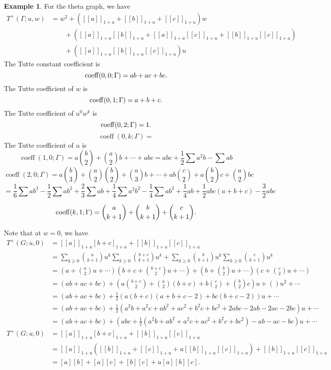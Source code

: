 \documentclass{amsart}
\theoremstyle{definition}
\newtheorem{eg}[thm]{Example}
\DeclareMathOperator{\coeff}{coeff}
\newcommand{\fanalog}[2]{[\![#2]\!]_{#1}}
\begin{document}
\begin{eg}
For the theta graph, we have
\begin{align*}
T^+(\Gamma; u,w) &= w^2 + (\fanalog{1 + u}{a} + \fanalog{1 + u}{b} + \fanalog{1 + u}{c})w  \\
&\qquad + (\fanalog{1 + u}{a} \fanalog{1 + u}{b} + \fanalog{1 + u}{a} \fanalog{1 + u}{c}  + \fanalog{1 + u}{b} \fanalog{1 + u}{c}) \\
&\qquad + (\fanalog{1 + u}{a} \fanalog{1 + u}{b} \fanalog{1 + u}{c})u
\end{align*}
The Tutte constant coefficient is 
$$ {\rm coeff}(0,0; \Gamma) = ab + ac + bc .$$
The Tutte coefficient of $w$ is
$$ {\rm coeff}(0,1; \Gamma) = a + b + c .$$
The Tutte coefficient of $u^0 w^k$ is
$$ {\rm coeff}(0,2; \Gamma) = 1 .$$
$$ \coeff(0,k; \Gamma) = $$
The Tutte coefficient of $u$ is 
\[
	\coeff(1, 0; \Gamma) = a \binom{b}{2} + \binom{a}{2} b + \cdots + abc
	= abc + \frac12 \sum a^2 b - \sum ab
\]
\[
	\coeff(2, 0; \Gamma) = a \binom{b}{3} + \binom{a}{2} \binom{b}{2} + \binom{a}{3} b + \cdots + ab \binom{c}{2} + a \binom{b}{2} c + \binom{a}{2} bc
\]
\[
	= \frac16 \sum a b^3 - \frac12 \sum a b^2 + \frac23 \sum a b + \frac14 \sum a^2 b^2 - \frac14 \sum a b^2 + \frac14 a b + \frac12 abc(a + b + c) - \frac32 abc
\]


$$ {\rm coeff}(k,1; \Gamma) = \binom{a}{k+1} + \binom{b}{k+1} + \binom{c}{k+1} .$$

Note that at $w = 0$, we have
\begin{align*}
T^+(G;u,0) &= \fanalog{1 + u}{a} [b+c]_{1+u} + \fanalog{1 + u}{b}\fanalog{1 + u}{c} \\
&= \sum_{k\geq 0}\binom{a}{k+1}u^k \sum_{k\geq 0} \binom{b+c}{k+1}u^k + \sum_{k\geq 0}\binom{b}{k+1}u^k \sum_{k\geq 0}\binom{c}{k+1}u^k \\
&= \left( a + \binom{a}{2}u + \cdots\right) \left(b + c + \binom{b+c}{2} u + \cdots\right) + \left(b + \binom{b}{2}u + \cdots\right) \left(c + \binom{c}{2}u + \cdots\right) \\
&= (ab + ac + bc) + \left(a\binom{b+c}{2} + \binom{a}{2}(b+c) + b\binom{c}{2} + \binom{b}{2} c \right)u + () u^2 + \cdots  \\
&= (ab + ac + bc) + \frac12 \left(a(b+c)(a+b+c-2) + bc(b+c-2) \right)u + \cdots \\
&= (ab + ac + bc) + \frac12 \left(a^2b + a^2c +ab^2 +ac^2 + b^2c + bc^2 + 2abc-2ab - 2ac - 2bc \right)u + \cdots \\
&= (ab + ac + bc) + \left(abc + \frac12 (a^2b + ab^2 + a^2c + ac^2 + b^2 c + bc^2) - ab - ac - bc \right)u + \cdots
\end{align*}
\begin{align*}
T^+(G;u,0) &= \fanalog{1 + u}{a} [b+c]_{1+u} + \fanalog{1 + u}{b}\fanalog{1 + u}{c} \\
&= \fanalog{1 + u}{a} \left(\fanalog{1 + u}{b} + \fanalog{1 + u}{c} + u\fanalog{1 + u}{b} \fanalog{1 + u}{c} \right) + \fanalog{1 + u}{b} \fanalog{1 + u}{c} \\
&= [a][b] + [a][c] + [b][c] + u[a][b][c] .
\end{align*}

\end{eg}
\end{document}
